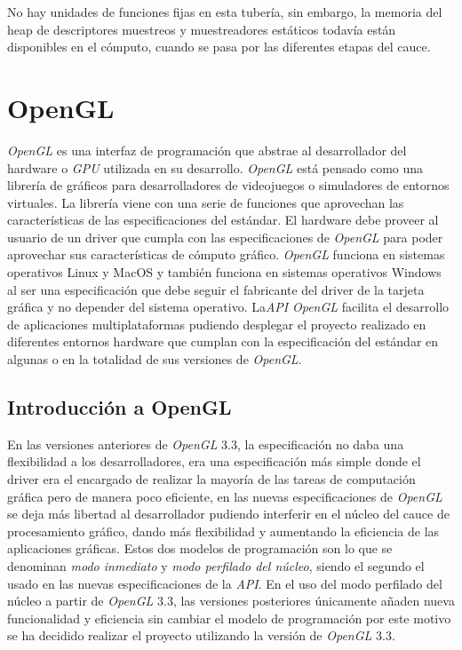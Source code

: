 \documentclass[a4paper]{book}
\begin{document}
No hay unidades de funciones fijas en esta tubería, sin embargo, la memoria del heap de descriptores muestreos y muestreadores
estáticos todavía están disponibles en el cómputo, cuando se pasa por las diferentes etapas del cauce.

\section{OpenGL}
\label{sec:OpenGL}

\textit{OpenGL} es una interfaz de programación que abstrae al desarrollador del hardware o \textit{GPU} utilizada en su desarrollo.
\textit{OpenGL} está pensado como una librería de gráficos para desarrolladores de videojuegos o simuladores de entornos virtuales.
La librería viene con una serie de funciones que aprovechan las características de las especificaciones del estándar.
El hardware debe proveer al usuario de un driver que cumpla con las especificaciones de \textit{OpenGL} para poder aprovechar
sus características de cómputo gráfico. \textit{OpenGL} funciona en sistemas operativos Linux y MacOS y también funciona en
sistemas operativos Windows al ser una especificación que debe seguir el fabricante del driver de la tarjeta gráfica y
no depender del sistema operativo. La\textit{API} \textit{OpenGL} facilita el desarrollo de aplicaciones multiplataformas
pudiendo desplegar el proyecto realizado en diferentes entornos hardware que cumplan con la especificación del estándar
en algunas o en la totalidad de sus versiones de \textit{OpenGL}.

\subsection{Introducción a OpenGL}
\label{subsec:IntroOpenGL}

En las versiones anteriores de \textit{OpenGL} 3.3, la especificación no daba una flexibilidad a los desarrolladores, era una
especificación más simple donde el driver era el encargado de realizar la mayoría de las tareas de computación
gráfica pero de manera poco eficiente, en las nuevas especificaciones de \textit{OpenGL} se deja más libertad al desarrollador
pudiendo interferir en el núcleo del cauce de procesamiento gráfico, dando más flexibilidad y aumentando la eficiencia
de las aplicaciones gráficas. Estos dos modelos de programación son lo que se denominan \textit{modo inmediato} y \textit{modo perfilado
del núcleo}, siendo el segundo el usado en las nuevas especificaciones de la \textit{API}. En el uso del modo perfilado del núcleo
a partir de \textit{OpenGL} 3.3, las versiones posteriores únicamente añaden nueva funcionalidad y eficiencia sin cambiar el
modelo de programación por este motivo se ha decidido realizar el proyecto utilizando la versión de \textit{OpenGL} 3.3.
\end{document}
